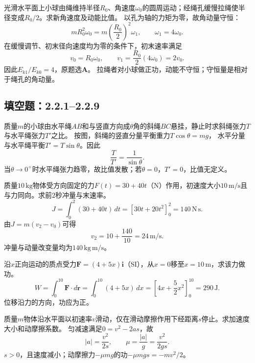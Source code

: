 \problemtext 光滑水平面上小球由绳维持半径$R_0$、角速度$\omega_0$的圆周运动；经绳孔缓慢拉绳使半径变成$R_0/2$。求新角速度及动能比值。
\workings
以孔为轴的力矩为零，故角动量守恒：
\[
mR_0^2\omega_0=m\left(\frac{R_0}{2}\right)^2\omega_1,
\qquad
\boxed{\omega_1=4\omega_0}.
\]
在缓慢调节、初末径向速度均为零的条件下，初末速率满足
\[
v_0=R_0\omega_0,\qquad
v_1=\frac{R_0}{2}(4\omega_0)=2v_0.
\]
因此$E_{k1}/E_{k0}=4$，原题选\textbf{A}。
\crosscheck 拉绳者对小球做正功，动能不守恒；守恒量是相对于绳孔的角动量。


\subsection{填空题：2.2.1--2.2.9}
\problemtext 质量$m$的小球由水平绳$AB$和与竖直方向成$\theta$角的斜绳$BC$悬挂，静止时求斜绳张力$T$与水平绳张力$T'$之比。
\workings
按图，斜绳的竖直分量平衡重力$T\cos\theta=mg$，
水平分量与水平绳平衡$T'=T\sin\theta$。因此
\[
\boxed{\frac{T}{T'}=\frac1{\sin\theta}}.
\]
\crosscheck 当$\theta\to0^+$时水平绳张力趋零，故比值发散；若$\theta=0$，$T'=0$，比值无定义。

\problemtext 质量$10\,\mathrm{kg}$物体受方向固定的力$F(t)=30+40t$（N）作用，初速度大小$10\,\mathrm{m/s}$且与力同向。求前$2$秒冲量与末速率。
\workings
\[
J=\int_0^2(30+40t)\,dt=[30t+20t^2]_0^2
=\boxed{140\,\mathrm{N\,s}}.
\]
由$J=m(v_2-v_0)$可得
\[
\boxed{v_2=10+\frac{140}{10}=24\,\mathrm{m/s}}.
\]
\crosscheck 冲量与动量改变量均为$140\,\mathrm{kg\,m/s}$。

\problemtext 沿$x$正向运动的质点受力$\bm F=(4+5x)\bm i$（SI），从$x=0$移至$x=10\,\mathrm m$，求该力做功。
\workings
\[
W=\int_0^{10}\bm F\cdot d\bm r
=\int_0^{10}(4+5x)\,dx
=\left[4x+\frac52x^2\right]_0^{10}
=\boxed{290\,\mathrm J}.
\]
\crosscheck 位移沿力的方向，功应为正。

\problemtext 质量$m$物体沿水平面以初速率$v$滑动，仅在滑动摩擦作用下经距离$s$停止。求加速度大小和动摩擦系数。
\workings
匀减速满足$0=v^2-2as$，故
\[
\boxed{|a|=\frac{v^2}{2s}},\qquad
\mu=\frac{|a|}{g}=\boxed{\frac{v^2}{2gs}}.
\]
\crosscheck $s>0$，且速度减小；动摩擦力$-\mu mg$的功$-\mu mgs=-mv^2/2$。

